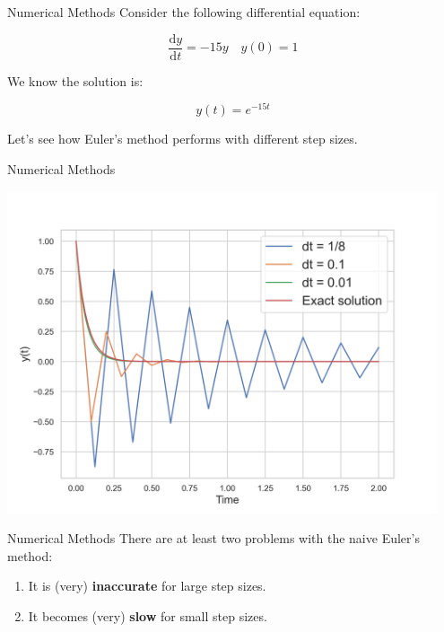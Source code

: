 \documentclass{beamer}
\begin{document}
\begin{frame}{Numerical Methods}
    Consider the following differential equation:

    \vspace{0.5cm}

    \begin{equation}
        \frac{\mathrm{d}y}{\mathrm{d}t} = -15y \quad y(0) = 1
    \end{equation}

    \vspace{0.5cm}

    We know the solution is:

    \vspace{0.5cm}

    \begin{equation}
        y(t) = e^{-15t}
    \end{equation}

    \vspace{0.5cm}

    Let's see how Euler's method performs with different step sizes.
\end{frame}


\begin{frame}{Numerical Methods}
    \begin{center}
        \includegraphics[width=0.95\textwidth]{asset/euler_method.png}
    \end{center}
\end{frame}


\begin{frame}{Numerical Methods}
    There are at least two problems with the naive Euler's method:

    \vspace{0.5cm}

    \begin{enumerate}
        \item It is (very) \textbf{inaccurate} for large step sizes.
        \item It becomes (very) \textbf{slow} for small step sizes.
    \end{enumerate}
\end{frame}
\end{document}

